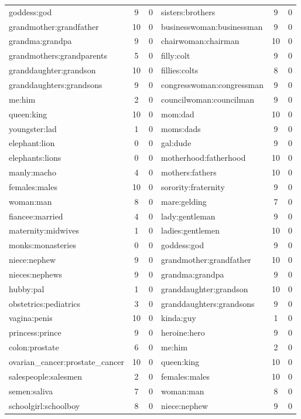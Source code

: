 \documentclass{article}
\begin{document}
\begin{longtable}{l|c|c|l|c|c}
goddess:god & 9 & 0 & sisters:brothers & 9 &0 \\
grandmother:grandfather & 10 & 0 & businesswoman:businessman & 9 &0 \\
grandma:grandpa & 9 & 0 & chairwoman:chairman & 10 &0 \\
grandmothers:grandparents & 5 & 0 & filly:colt & 9 &0 \\
granddaughter:grandson & 10 & 0 & fillies:colts & 8 &0 \\
granddaughters:grandsons & 9 & 0 & congresswoman:congressman & 9 &0 \\
me:him & 2 & 0 & councilwoman:councilman & 9 &0 \\
queen:king & 10 & 0 & mom:dad & 10 &0 \\
youngster:lad & 1 & 0 & moms:dads & 9 &0 \\
elephant:lion & 0 & 0 & gal:dude & 9 &0 \\
elephants:lions & 0 & 0 & motherhood:fatherhood & 10 &0 \\
manly:macho & 4 & 0 & mothers:fathers & 10 &0 \\
females:males & 10 & 0 & sorority:fraternity & 9 &0 \\
woman:man & 8 & 0 & mare:gelding & 7 &0 \\
fiancee:married & 4 & 0 & lady:gentleman & 9 &0 \\
maternity:midwives & 1 & 0 & ladies:gentlemen & 10 &0 \\
monks:monasteries & 0 & 0 & goddess:god & 9 &0 \\
niece:nephew & 9 & 0 & grandmother:grandfather & 10 &0 \\
nieces:nephews & 9 & 0 & grandma:grandpa & 9 &0 \\
hubby:pal & 1 & 0 & granddaughter:grandson & 10 &0 \\
obstetrics:pediatrics & 3 & 0 & granddaughters:grandsons & 9 &0 \\
vagina:penis & 10 & 0 & kinda:guy & 1 &0 \\
princess:prince & 9 & 0 & heroine:hero & 9 &0 \\
colon:prostate & 6 & 0 & me:him & 2 &0 \\
ovarian\_cancer:prostate\_cancer & 10 & 0 & queen:king & 10 &0 \\
salespeople:salesmen & 2 & 0 & females:males & 10 &0 \\
semen:saliva & 7 & 0 & woman:man & 8 &0 \\
schoolgirl:schoolboy & 8 & 0 & niece:nephew & 9 &0 \\

\end{longtable}
\end{document}
